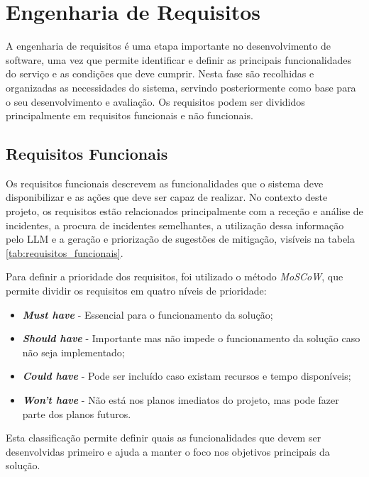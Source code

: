 \section{Engenharia de Requisitos}

	A engenharia de requisitos é uma etapa importante no desenvolvimento de software, uma vez que permite identificar e definir as principais funcionalidades do serviço e as condições que deve cumprir. Nesta fase são recolhidas e organizadas as necessidades do sistema, servindo posteriormente como base para o seu desenvolvimento e avaliação. Os requisitos podem ser divididos principalmente em requisitos funcionais e não funcionais.

	\subsection{Requisitos Funcionais}
	
		Os requisitos funcionais descrevem as funcionalidades que o sistema deve disponibilizar e as ações que deve ser capaz de realizar. No contexto deste projeto, os requisitos estão relacionados principalmente com a receção e análise de incidentes, a procura de incidentes semelhantes, a utilização dessa informação pelo \gls{LLM} e a geração e priorização de sugestões de mitigação, visíveis na tabela \ref{tab:requisitos_funcionais}.
		
		Para definir a prioridade dos requisitos, foi utilizado o método \textit{MoSCoW}, que permite dividir os requisitos em quatro níveis de prioridade:
		
		\begin{itemize}
			\item \textbf{\textit{Must have}} - Essencial para o funcionamento da solução;
			\item \textbf{\textit{Should have}} - Importante mas não impede o funcionamento da solução caso não seja implementado;
			\item \textbf{\textit{Could have}} - Pode ser incluído caso existam recursos e tempo disponíveis;
			\item \textbf{\textit{Won't have}} - Não está nos planos imediatos do projeto, mas pode fazer parte dos planos futuros.
		\end{itemize}
		
		Esta classificação permite definir quais as funcionalidades que devem ser desenvolvidas primeiro e ajuda a manter o foco nos objetivos principais da solução.
	
